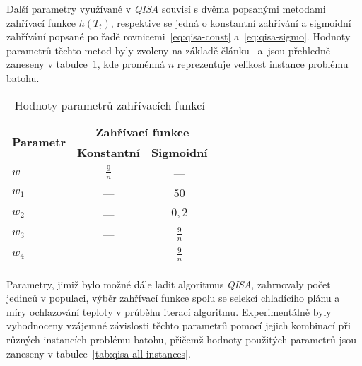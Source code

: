 Další parametry využívané v \emph{QISA} souvisí s dvěma popsanými metodami zahřívací funkce $h\left(T_t\right)$, respektive se jedná o konstantní zahřívání a sigmoidní zahřívání popsané po řadě rovnicemi~\ref{eq:qisa-const} a~\ref{eq:qisa-sigmo}. 
Hodnoty parametrů těchto metod byly zvoleny na základě článku~\cite{qisa} a~jsou přehledně zaneseny v tabulce~\ref{tab:qisa-heating-params}, kde proměnná $n$ reprezentuje velikost instance problému batohu.
\begin{table}[ht]
    \centering
    \label{tab:qisa-heating-params}
    \begin{tabular}{lcc}
      \toprule
      \multirow{2}{*}{\textbf{Parametr}}  & \multicolumn{2}{c}{\textbf{Zahřívací funkce}} \\
      \cmidrule(lr){2-3}
            & \textbf{Konstantní}  & \textbf{Sigmoidní} \\
      \midrule
      $w$   & $\frac{9}{n}$        & ---                \\[1ex]
      $w_1$ & ---                  & $50$               \\[1ex]
      $w_2$ & ---                  & $0,2$              \\[1ex]
      $w_3$ & ---                  & $\frac{9}{n}$      \\[1ex]
      $w_4$ & ---                  & $\frac{9}{n}$      \\
      \bottomrule
    \end{tabular}
    \caption{Hodnoty parametrů zahřívacích funkcí}
\end{table}

Parametry, jimiž bylo možné dále ladit algoritmus \emph{QISA}, zahrnovaly počet jedinců v populaci, výběr zahřívací funkce spolu se selekcí chladícího plánu a míry ochlazování teploty v průběhu iterací algoritmu. 
Experimentálně byly vyhodnoceny vzájemné závislosti těchto parametrů pomocí jejich kombinací při různých instancích problému batohu, přičemž hodnoty použitých parametrů jsou zaneseny v tabulce~\ref{tab:qisa-all-instances}.

